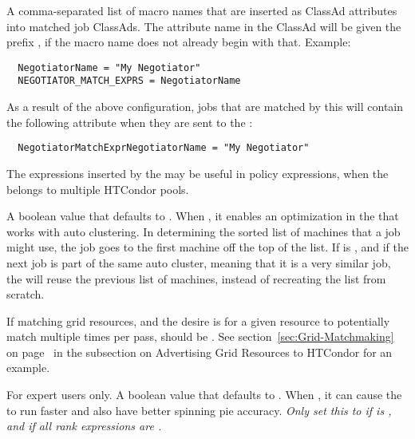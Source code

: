 \begin{description}
\label{param:NegotiatorMatchExprs}
\item[\Macro{NEGOTIATOR\_MATCH\_EXPRS}]
  A comma-separated list of macro names that are inserted as
  ClassAd attributes into matched job ClassAds.
  The attribute name in the ClassAd will be given the prefix
  , 
  if the macro name does not already begin with that.
  Example:

\footnotesize
\begin{verbatim}
  NegotiatorName = "My Negotiator"
  NEGOTIATOR_MATCH_EXPRS = NegotiatorName
\end{verbatim}
\normalsize

  As a result of the above configuration, jobs that are matched by this
   will contain the following attribute when they are 
  sent to the :

\footnotesize
\begin{verbatim}
  NegotiatorMatchExprNegotiatorName = "My Negotiator"
\end{verbatim}
\normalsize

  The expressions inserted by the  may be useful in 
   policy expressions,
  when the  belongs to multiple HTCondor pools.

\label{param:NegotiatorMatchlistCaching}
\item[\Macro{NEGOTIATOR\_MATCHLIST\_CACHING}]
  A boolean value that defaults to .
  When , it enables an optimization in the 
  that works with auto clustering.
  In determining the sorted list of machines that a job might use,
  the job goes to the first machine off the top of the list. 
  If  is ,
  and if the next job is part of the same auto cluster,
  meaning that it is a very similar job,
  the  will reuse the previous list of machines,
  instead of recreating the list from scratch.

  If matching grid resources, and the desire is for a
  given resource to potentially match multiple times per 
  pass,  should be .
  See section~\ref{sec:Grid-Matchmaking} on page~\pageref{sec:Grid-Matchmaking}
  in the subsection on Advertising Grid Resources to HTCondor for an example.

\label{param:NegotiatorConsiderPreemption}
\item[\Macro{NEGOTIATOR\_CONSIDER\_PREEMPTION}]
  For expert users only. A boolean value that defaults to .
  When ,
  it can cause the  to run
  faster and also have better spinning pie accuracy.
  \emph{Only set this to  if 
  is ,
  and if all  rank expressions are .}


\end{description}
